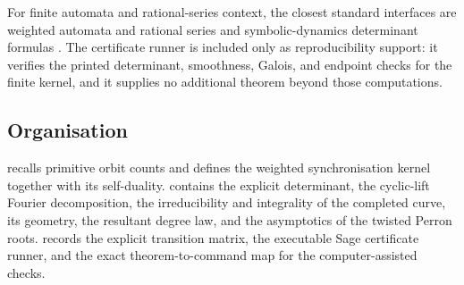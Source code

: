For finite automata and rational-series context, the closest standard
interfaces are weighted automata and rational series
\cite{Schutzenberger1961,BerstelReutenauer2011} and symbolic-dynamics
determinant formulas
\cite{BowenLanford1970Zeta,Manning1971Axiom,LindMarcus2021}.  The
certificate runner is included only as reproducibility support: it
verifies the printed determinant, smoothness, Galois, and endpoint
checks for the finite kernel, and it supplies no additional theorem
beyond those computations.

\subsection{Organisation}

 recalls primitive orbit counts and defines the
weighted synchronisation kernel together with its self-duality.
 contains the explicit determinant, the
cyclic-lift Fourier decomposition, the irreducibility and integrality
of the completed curve, its geometry, the resultant degree law, and the
asymptotics of the twisted Perron roots.
 records the explicit transition matrix,
the executable Sage certificate runner, and the exact
theorem-to-command map for the computer-assisted checks.







